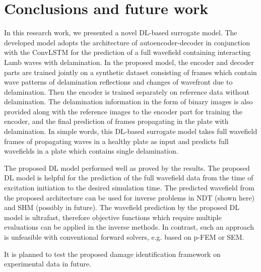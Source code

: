 \section{Conclusions and future work}
\label{conclusion}
In this research work, we presented a novel DL-based surrogate model. 
The developed model adopts the architecture of autoencoder-decoder in conjunction with the ConvLSTM for the prediction of a full wavefield containing interacting Lamb waves with delamination. 
In the proposed model, the encoder and decoder parts are trained jointly on a synthetic dataset consisting of frames which contain wave patterns of delamination reflections and changes of wavefront due to delamination. 
Then the encoder is trained separately on reference data without delamination. 
The delamination information in the form of binary images is also provided along with the reference images to the encoder part for training the encoder, and the final prediction of frames propagating in the plate with delamination.
In simple words, this DL-based surrogate model takes full wavefield frames of propagating waves in a healthy plate as input and predicts full wavefields in a plate which contains single delamination.

The proposed DL model performed well as proved by the results.
The proposed DL model is helpful for the prediction of the full wavefield data from the time of excitation initiation to the desired simulation time. 
The predicted wavefield from the proposed architecture can be used for inverse problems in NDT (shown here) and SHM (possibly in future).
The wavefield prediction by the proposed DL model is ultrafast, therefore objective functions which require multiple evaluations can be applied in the inverse methods.
In contrast, such an approach is unfeasible with conventional forward solvers, e.g. based on p-FEM or SEM. 

It is planned to test the proposed damage identification framework on experimental data in future.